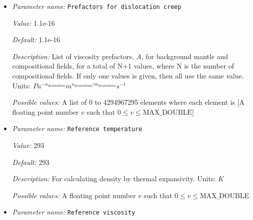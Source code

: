 \begin{itemize}
{\it Value:} 1.5e-15


{\it Default:} 1.5e-15


{\it Description:} List of viscosity prefactors, $A$, for background mantle and compositional fields, for a total of N+1 values, where N is the number of compositional fields. If only one values is given, then all use the same value. Units: $Pa^{-n_{diffusion}} m^{n_{diffusion}/m_{diffusion}} s^{-1}$


{\it Possible values:} A list of 0 to 4294967295 elements where each element is [A floating point number $v$ such that $0 \leq v \leq \text{MAX\_DOUBLE}$]
\item {\it Parameter name:} {\tt Prefactors for dislocation creep}
\label{parameters:Material model/Diffusion dislocation/Prefactors for dislocation creep}


{\it Value:} 1.1e-16


{\it Default:} 1.1e-16


{\it Description:} List of viscosity prefactors, $A$, for background mantle and compositional fields, for a total of N+1 values, where N is the number of compositional fields. If only one values is given, then all use the same value. Units: $Pa^{-n_{dislocation}} m^{n_{dislocation}/m_{dislocation}} s^{-1}$


{\it Possible values:} A list of 0 to 4294967295 elements where each element is [A floating point number $v$ such that $0 \leq v \leq \text{MAX\_DOUBLE}$]
\item {\it Parameter name:} {\tt Reference temperature}
\label{parameters:Material model/Diffusion dislocation/Reference temperature}


{\it Value:} 293


{\it Default:} 293


{\it Description:} For calculating density by thermal expansivity. Units: $K$


{\it Possible values:} A floating point number $v$ such that $0 \leq v \leq \text{MAX\_DOUBLE}$
\item {\it Parameter name:} {\tt Reference viscosity}
\label{parameters:Material model/Diffusion dislocation/Reference viscosity}



\end{itemize}
